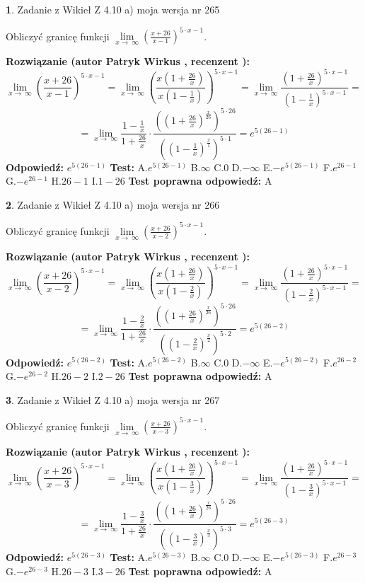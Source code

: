 \documentclass[12pt, a4paper]{article}
\theoremstyle{definition} %
\newtheorem{zad}{}
\newcommand{\zadStart}[1]{\begin{zad}#1\newline}
\newcommand{\zadStop}{\end{zad}}
\newcommand{\rozwStart}[2]{\noindent \textbf{Rozwiązanie (autor #1 , recenzent #2): }\newline}
\newcommand{\rozwStop}{\newline}
\newcommand{\odpStart}{\noindent \textbf{Odpowiedź:}\newline}
\newcommand{\odpStop}{\newline}
\newcommand{\testStart}{\noindent \textbf{Test:}\newline}
\newcommand{\testStop}{\newline}
\newcommand{\kluczStart}{\noindent \textbf{Test poprawna odpowiedź:}\newline}
\newcommand{\kluczStop}{\newline}
\begin{document}
\zadStart{Zadanie z Wikieł Z 4.10 a) moja wersja nr 265}


Obliczyć granicę funkcji  $\lim\limits_{x\to\ \infty}(\frac{x+26}{x-1})^{5\cdot x-1}$.
\zadStop
\rozwStart{Patryk Wirkus}{}
$$\lim\limits_{x\to\ \infty}(\frac{x+26}{x-1})^{5\cdot x-1} = \lim\limits_{x\to\ \infty}(\frac{x(1+\frac{26}{x})}{x(1-\frac{1}{x})})^{5\cdot x-1}=\lim\limits_{x\to\ \infty}\frac{(1+\frac{26}{x})^{5\cdot x-1}}{(1-\frac{1}{x})^{5\cdot x-1}}=$$
$$=\lim\limits_{x\to\ \infty}\frac{1-\frac{1}{x}}{1+\frac{26}{x}}\cdot\frac{((1+\frac{26}{x})^{\frac{x}{26}})^{5\cdot26}}{((1-\frac{1}{x})^{\frac{x}{1}})^{5\cdot1}}=e^{5(26-1)}$$
\rozwStop
\odpStart
$e^{5(26-1)}$
\odpStop
\testStart
A.$e^{5(26-1)}$ B.$\infty$ C.$0$ D.$-\infty$ E.$-e^{5(26-1)}$
F.$e^{26-1}$ G.$-e^{26-1}$
H.$26-1$
I.$1-26$
\testStop
\kluczStart
A
\kluczStop



\zadStart{Zadanie z Wikieł Z 4.10 a) moja wersja nr 266}


Obliczyć granicę funkcji  $\lim\limits_{x\to\ \infty}(\frac{x+26}{x-2})^{5\cdot x-1}$.
\zadStop
\rozwStart{Patryk Wirkus}{}
$$\lim\limits_{x\to\ \infty}(\frac{x+26}{x-2})^{5\cdot x-1} = \lim\limits_{x\to\ \infty}(\frac{x(1+\frac{26}{x})}{x(1-\frac{2}{x})})^{5\cdot x-1}=\lim\limits_{x\to\ \infty}\frac{(1+\frac{26}{x})^{5\cdot x-1}}{(1-\frac{2}{x})^{5\cdot x-1}}=$$
$$=\lim\limits_{x\to\ \infty}\frac{1-\frac{2}{x}}{1+\frac{26}{x}}\cdot\frac{((1+\frac{26}{x})^{\frac{x}{26}})^{5\cdot26}}{((1-\frac{2}{x})^{\frac{x}{2}})^{5\cdot2}}=e^{5(26-2)}$$
\rozwStop
\odpStart
$e^{5(26-2)}$
\odpStop
\testStart
A.$e^{5(26-2)}$ B.$\infty$ C.$0$ D.$-\infty$ E.$-e^{5(26-2)}$
F.$e^{26-2}$ G.$-e^{26-2}$
H.$26-2$
I.$2-26$
\testStop
\kluczStart
A
\kluczStop



\zadStart{Zadanie z Wikieł Z 4.10 a) moja wersja nr 267}


Obliczyć granicę funkcji  $\lim\limits_{x\to\ \infty}(\frac{x+26}{x-3})^{5\cdot x-1}$.
\zadStop
\rozwStart{Patryk Wirkus}{}
$$\lim\limits_{x\to\ \infty}(\frac{x+26}{x-3})^{5\cdot x-1} = \lim\limits_{x\to\ \infty}(\frac{x(1+\frac{26}{x})}{x(1-\frac{3}{x})})^{5\cdot x-1}=\lim\limits_{x\to\ \infty}\frac{(1+\frac{26}{x})^{5\cdot x-1}}{(1-\frac{3}{x})^{5\cdot x-1}}=$$
$$=\lim\limits_{x\to\ \infty}\frac{1-\frac{3}{x}}{1+\frac{26}{x}}\cdot\frac{((1+\frac{26}{x})^{\frac{x}{26}})^{5\cdot26}}{((1-\frac{3}{x})^{\frac{x}{3}})^{5\cdot3}}=e^{5(26-3)}$$
\rozwStop
\odpStart
$e^{5(26-3)}$
\odpStop
\testStart
A.$e^{5(26-3)}$ B.$\infty$ C.$0$ D.$-\infty$ E.$-e^{5(26-3)}$
F.$e^{26-3}$ G.$-e^{26-3}$
H.$26-3$
I.$3-26$
\testStop
\kluczStart
A
\kluczStop
\end{document}
